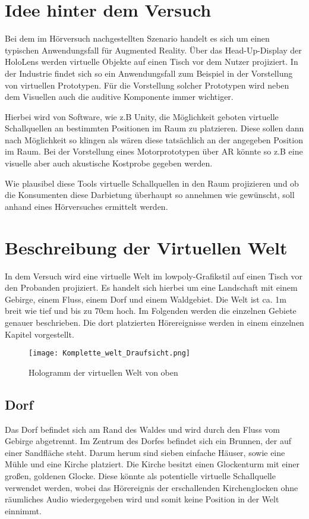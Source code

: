  \section{Idee hinter dem Versuch}
 
 Bei dem im Hörversuch nachgestellten Szenario handelt es sich um einen typischen Anwendungsfall für Augmented Reality. Über das Head-Up-Display der HoloLens werden virtuelle Objekte auf einen Tisch vor dem Nutzer projiziert. In der Industrie findet sich so ein Anwendungsfall zum Beispiel in der Vorstellung von virtuellen Prototypen. Für die Vorstellung solcher Prototypen wird neben dem Visuellen auch die auditive Komponente immer wichtiger. 
 
 Hierbei wird von Software, wie z.B Unity, die Möglichkeit geboten virtuelle Schallquellen an bestimmten Positionen im Raum zu platzieren. Diese sollen dann nach Möglichkeit so klingen als wären diese tatsächlich an der angegeben Position im Raum.  Bei der Vorstellung eines Motorprototypen über AR könnte so z.B eine visuelle aber auch akustische Kostprobe gegeben werden. 
 
 Wie plausibel diese Tools virtuelle Schallquellen in den Raum projizieren und ob die Konsumenten diese Darbietung überhaupt so annehmen wie gewünscht, soll anhand eines Hörversuches ermittelt werden. 
 
 \newpage
 \section{Beschreibung der Virtuellen Welt}
 
 In dem Versuch wird eine virtuelle Welt im lowpoly-Grafikstil auf einen Tisch vor den Probanden projiziert. Es handelt sich hierbei um eine  Landschaft mit einem Gebirge, einem Fluss, einem Dorf und einem Waldgebiet. Die Welt ist ca. 1m breit wie tief und bis zu 70cm hoch. Im Folgenden werden die einzelnen Gebiete genauer beschrieben. Die dort platzierten Hörereignisse werden in einem einzelnen Kapitel vorgestellt. 
 
 \begin{figure}[H]
\centering
\texttt{[image: Komplette\_welt\_Draufsicht.png]}
\caption{Hologramm der virtuellen Welt von oben}
\label{fig:Draufsicht}
\end{figure} 

\subsection{Dorf}
Das Dorf befindet sich am Rand des Waldes und wird durch den Fluss vom Gebirge abgetrennt. Im Zentrum des Dorfes befindet sich ein Brunnen, der auf einer Sandfläche steht. Darum herum sind sieben einfache Häuser, sowie eine Mühle und eine Kirche platziert. Die Kirche besitzt einen Glockenturm mit einer großen, goldenen Glocke. Diese könnte als potentielle virtuelle Schallquelle verwendet werden, wobei das Hörereignis der erschallenden Kirchenglocken ohne räumliches Audio wiedergegeben wird und somit keine Position in der Welt einnimmt. \\

